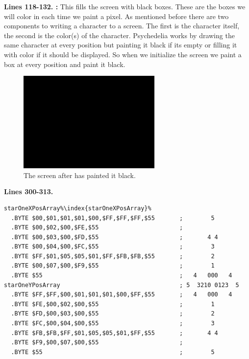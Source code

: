\bigskip
\bigskip
\bigskip
\bigskip
\textbf{Lines 118-132. :} This fills the screen with black boxes. These are the boxes we will color in each time we paint a pixel.
As mentioned before there are two components to writing a character to a screen. The first is the character
itself, the second is the color(s) of the character. Psychedelia works by drawing the same character at every
position but painting it black if its empty or filling it with color if it should be displayed. So when
we initialize the screen we paint a box at every position and paint it black.

\begin{figure}[H]
    \centering
      \includegraphics[height=5cm]{src/listing_commentary/black.png}
  \caption*{The screen after  has painted it black.}
\end{figure}

\clearpage
\textbf{Lines 300-313. }
\begin{lstlisting}[caption = Hopefully this looks familiar.,escapechar=\%]
starOneXPosArray%\index{starOneXPosArray}%
  .BYTE $00,$01,$01,$01,$00,$FF,$FF,$FF,$55       ;        5       
  .BYTE $00,$02,$00,$FE,$55                       ;                
  .BYTE $00,$03,$00,$FD,$55                       ;       4 4      
  .BYTE $00,$04,$00,$FC,$55                       ;        3       
  .BYTE $FF,$01,$05,$05,$01,$FF,$FB,$FB,$55       ;        2       
  .BYTE $00,$07,$00,$F9,$55                       ;        1       
  .BYTE $55                                       ;   4   000   4  
starOneYPosArray                                  ; 5  3210 0123  5 
  .BYTE $FF,$FF,$00,$01,$01,$01,$00,$FF,$55       ;   4   000   4  
  .BYTE $FE,$00,$02,$00,$55                       ;        1       
  .BYTE $FD,$00,$03,$00,$55                       ;        2       
  .BYTE $FC,$00,$04,$00,$55                       ;        3       
  .BYTE $FB,$FB,$FF,$01,$05,$05,$01,$FF,$55       ;       4 4      
  .BYTE $F9,$00,$07,$00,$55                       ;                
  .BYTE $55                                       ;        5       
\end{lstlisting}

